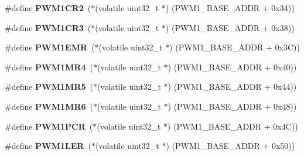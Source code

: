 \begin{DoxyCompactItemize}
\item 
\mbox{\label{group__lpc24xx__regs_ga72319c34fab87dd5c993dfaa11496ccf}} 
\#define {\bfseries P\+W\+M1\+C\+R2}~($\ast$(volatile uint32\+\_\+t $\ast$) (P\+W\+M1\+\_\+\+B\+A\+S\+E\+\_\+\+A\+D\+DR + 0x34))
\item 
\mbox{\label{group__lpc24xx__regs_gac3c69b776f9d73862a3f9b1b2e8b958a}} 
\#define {\bfseries P\+W\+M1\+C\+R3}~($\ast$(volatile uint32\+\_\+t $\ast$) (P\+W\+M1\+\_\+\+B\+A\+S\+E\+\_\+\+A\+D\+DR + 0x38))
\item 
\mbox{\label{group__lpc24xx__regs_gaed7d788a31d0125b61035e29fe222e2b}} 
\#define {\bfseries P\+W\+M1\+E\+MR}~($\ast$(volatile uint32\+\_\+t $\ast$) (P\+W\+M1\+\_\+\+B\+A\+S\+E\+\_\+\+A\+D\+DR + 0x3\+C))
\item 
\mbox{\label{group__lpc24xx__regs_gacdb17b6472b0b4b2cdc21ada7430ae24}} 
\#define {\bfseries P\+W\+M1\+M\+R4}~($\ast$(volatile uint32\+\_\+t $\ast$) (P\+W\+M1\+\_\+\+B\+A\+S\+E\+\_\+\+A\+D\+DR + 0x40))
\item 
\mbox{\label{group__lpc24xx__regs_ga791a666f7373a4e3f43c3c0439c36f5c}} 
\#define {\bfseries P\+W\+M1\+M\+R5}~($\ast$(volatile uint32\+\_\+t $\ast$) (P\+W\+M1\+\_\+\+B\+A\+S\+E\+\_\+\+A\+D\+DR + 0x44))
\item 
\mbox{\label{group__lpc24xx__regs_ga0d2feca139bbc158a17f67d19d7b3a36}} 
\#define {\bfseries P\+W\+M1\+M\+R6}~($\ast$(volatile uint32\+\_\+t $\ast$) (P\+W\+M1\+\_\+\+B\+A\+S\+E\+\_\+\+A\+D\+DR + 0x48))
\item 
\mbox{\label{group__lpc24xx__regs_gae0a51932c27868a0c09e465063ab7112}} 
\#define {\bfseries P\+W\+M1\+P\+CR}~($\ast$(volatile uint32\+\_\+t $\ast$) (P\+W\+M1\+\_\+\+B\+A\+S\+E\+\_\+\+A\+D\+DR + 0x4\+C))
\item 
\mbox{\label{group__lpc24xx__regs_gaab6c010139cf54626f69a5ad4bfd9fe7}} 
\#define {\bfseries P\+W\+M1\+L\+ER}~($\ast$(volatile uint32\+\_\+t $\ast$) (P\+W\+M1\+\_\+\+B\+A\+S\+E\+\_\+\+A\+D\+DR + 0x50))
\item 
\mbox{\label{group__lpc24xx__regs_gabfb6e114090010f05da8a986ae474b44}} 

\end{DoxyCompactItemize}
